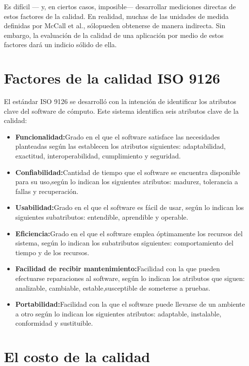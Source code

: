 Es difícil — y, en ciertos casos, imposible— desarrollar mediciones directas de estos factores de la calidad. En realidad, muchas de las unidades de medida definidas por McCall et al., sólopueden obtenerse de manera indirecta. Sin embargo, la evaluación de la calidad de una aplicación por medio de estos factores dará un indicio sólido de ella.\\

\section{Factores de la calidad ISO 9126}

El estándar ISO 9126 se desarrolló con la intención de identificar los atributos clave del software de cómputo. Este sistema identifica seis atributos clave de la calidad:\\
\begin{itemize}
    \item  \textbf{Funcionalidad:}Grado en el que el software satisface las necesidades planteadas según las
establecen los atributos siguientes: adaptabilidad, exactitud, interoperabilidad, cumplimiento
y seguridad.
    \item  \textbf{Confiabilidad:}Cantidad de tiempo que el software se encuentra disponible para su uso,según lo indican los siguientes atributos: madurez, tolerancia a fallas y recuperación.
    \item  \textbf{Usabilidad:}Grado en el que el software es fácil de usar, según lo indican los siguientes subatributos: entendible, aprendible y operable.
    \item  \textbf{Eficiencia:}Grado en el que el software emplea óptimamente los recursos del sistema, según lo indican los subatributos siguientes: comportamiento del tiempo y de los recursos.
    \item  \textbf{Facilidad de recibir mantenimiento:}Facilidad con la que pueden efectuarse reparaciones al software, según lo indican los atributos que siguen: analizable, cambiable, estable,susceptible de someterse a pruebas.
    \item  \textbf{Portabilidad:}Facilidad con la que el software puede llevarse de un ambiente a otro según lo indican los siguientes atributos: adaptable, instalable, conformidad y sustituible.
\end{itemize}

\section{El costo de la calidad}

